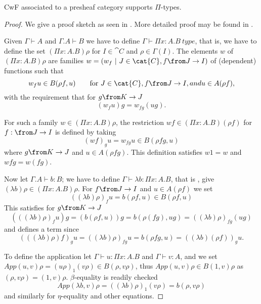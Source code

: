 \begin{lemma}
  CwF associated to a presheaf category supports $\Pi$-types.
  \begin{proof}
    We give a proof sketch as seen in \cite{Huber}. More detailed proof may be
    found in \cite{Hofmann}.

    Given $\Gamma \vdash A$ and $\Gamma.A \vdash B$ we have to define $\Gamma
    \vdash \Pi x: A. B~type$, that is, we have to define the set $(\Pi x: A.B)
    \rho$ for $I \in \cat{C}$ and $\rho \in \Gamma(I)$. The elements $w$ of
    $(\Pi x:A.B)\rho$ are families $w = (w_f~|~J\in \cat{C}, f \from J \to I)$
    of (dependent) functions such that
    \[
      w_f u \in B(\rho f, u) \qquad \text{for $J \in \cat{C}, f \from J \to I, and u \in A(\rho f)$},
    \]
    with the requirement that for $g \from K \to J$
    \[
      (w_f u)g = w_{fg}(ug).
    \]

    For such a family $w \in (\Pi x: A. B)\rho$, the restriction $wf \in (\Pi
    x:A.B)(\rho f)$ for $f: \from J \to I$ is defined by taking
    \[
      (w f)_g u = w_{fg}u \in B(\rho f g, u)
    \]
    where $g \from K \to J$ and $u \in A(\rho f g)$. This definition satisfies
    $w 1 = w$ and $w f g = w(f g)$.

    Now let $\Gamma.A \vdash b : B$; we have to define $\Gamma \vdash \lambda b
    : \Pi x:A.B$, that is , give $(\lambda b)\rho \in (\Pi x:A.B)\rho$. For $f
    \from J \to I$ and $u \in A(\rho f)$ we set
    \[
      ((\lambda b)\rho)_f u = b (\rho f, u) \in B(\rho f, u)
    \]
    This satisfies for $g \from K \to J$
    \[
      (((\lambda b)\rho)_f u)g = (b(\rho f, u))g = b(\rho(fg), ug) = ((\lambda b)\rho)_{fg}(ug)
    \]
    and defines a term since
    \[
      (((\lambda b)\rho)f)_g u = ((\lambda b) \rho)_{fg} u = b(\rho fg, u) = ((\lambda b)(\rho f))_g u.
    \]

    To define the application let $\Gamma \vdash u : \Pi x:A.B$ and $\Gamma
    \vdash v : A$, and we set $App(u, v)\rho = (u\rho)_1 (v\rho) \in B(\rho,
    v\rho)$, thus $App(u, v)\rho \in B(1, v)\rho$ as $(\rho, v \rho) = (1,
    v)\rho$. $\beta$-equality is readily checked
    \[
      App(\lambda b, v)\rho = ((\lambda b)\rho)_1(v\rho)=b(\rho, v\rho)
    \]
    and similarly for $\eta$-equality and other equations.
  \end{proof}
\end{lemma}

